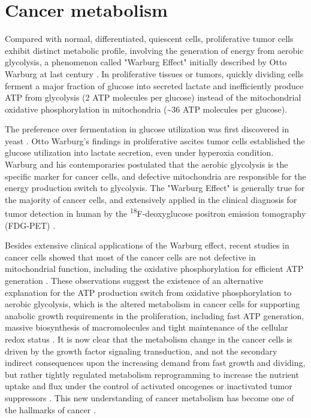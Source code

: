 \section{Cancer metabolism}

Compared with normal, differentiated, quiescent cells, proliferative tumor cells exhibit distinct metabolic profile, involving the generation of energy from aerobic glycolysis, a phenomenon called "Warburg Effect" initially described by Otto Warburg at last century \cite{warburg_respiratory_1956,warburg_origin_1956,warburg_metabolism_1931}. In proliferative tissues or tumors, quickly dividing cells ferment a major fraction of glucose into secreted lactate and inefficiently produce ATP from glycolysis (2 ATP molecules per glucose) instead of the mitochondrial oxidative phosphorylation in mitochondria (\textasciitilde36 ATP molecules per glucose). 

The preference over fermentation in glucose utilization was first discovered in yeast \cite{ward_metabolic_2012}. Otto Warburg's findings in proliferative ascites tumor cells established the glucose utilization into lactate secretion, even under hyperoxia condition. Warburg and his contemporaries postulated that the aerobic glycolysis is the specific marker for cancer cells, and defective mitochondria are responsible for the energy production switch to glycolysis. The "Warburg Effect" is generally true for the majority of cancer cells, and extensively applied in the clinical diagnosis for tumor detection in human by the \textsuperscript{18}F-deoxyglucose positron emission tomography (FDG-PET)  \cite{ward_metabolic_2012}.

Besides extensive clinical applications of the Warburg effect, recent studies in cancer cells showed that most of the cancer cells are not defective in mitochondrial function, including the oxidative phosphorylation for efficient ATP generation  \cite{fantin_attenuation_2006,moreno-sanchez_energy_2007,weinhouse_warburg_1976}. These observations suggest the existence of an alternative explanation for the ATP production switch from oxidative phosphorylation to aerobic glycolysis, which is the altered metabolism in cancer cells for supporting anabolic growth requirements in the proliferation, including fast ATP generation, massive biosynthesis of macromolecules and tight maintenance of the cellular redox status  \cite{cairns_regulation_2011}. It is now clear that the metabolism change in the cancer cells is driven by the growth factor signaling transduction, and not the secondary indirect consequences upon the increasing demand from fast growth and dividing, but rather tightly regulated metabolism reprogramming to increase the nutrient uptake and flux under the control of activated oncogenes or inactivated tumor suppressors  \cite{ward_metabolic_2012}. This new understanding of cancer metabolism has become one of the hallmarks of cancer  \cite{hanahan_hallmarks_2011}.

